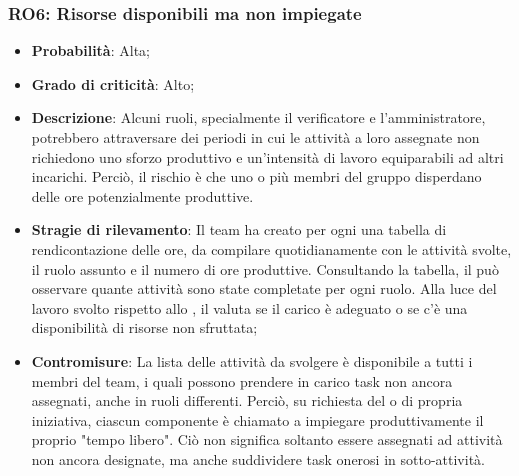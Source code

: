 \subsubsection{RO6: Risorse disponibili ma non impiegate}
\begin{itemize}
    \item \textbf{Probabilità}: Alta;
    \item \textbf{Grado di criticità}: Alto;
    \item \textbf{Descrizione}: Alcuni ruoli, specialmente il verificatore e l'amministratore, potrebbero attraversare dei periodi in cui le attività a loro assegnate non richiedono uno sforzo produttivo e un'intensità di lavoro equiparabili ad altri incarichi. Perciò, il rischio è che uno o più membri del gruppo disperdano delle ore potenzialmente produttive.
    \item \textbf{Stragie di rilevamento}: Il team ha creato per ogni  una tabella di rendicontazione delle ore, da compilare quotidianamente con le attività svolte, il ruolo assunto e il numero di ore produttive. Consultando la tabella, il \Responsabile{} può osservare quante attività sono state completate per ogni ruolo. Alla luce del lavoro svolto rispetto allo , il \Responsabile{} valuta se il carico è adeguato o se c'è una disponibilità di risorse non sfruttata;
    \item \textbf{Contromisure}: La lista delle attività da svolgere è disponibile a tutti i membri del team, i quali possono prendere in carico task non ancora assegnati, anche in ruoli differenti. Perciò, su richiesta del \Responsabile{} o di propria iniziativa, ciascun componente è chiamato a impiegare produttivamente il proprio "tempo libero". Ciò non significa soltanto essere assegnati ad attività non ancora designate, ma anche suddividere task onerosi in sotto-attività. 
\end{itemize}
